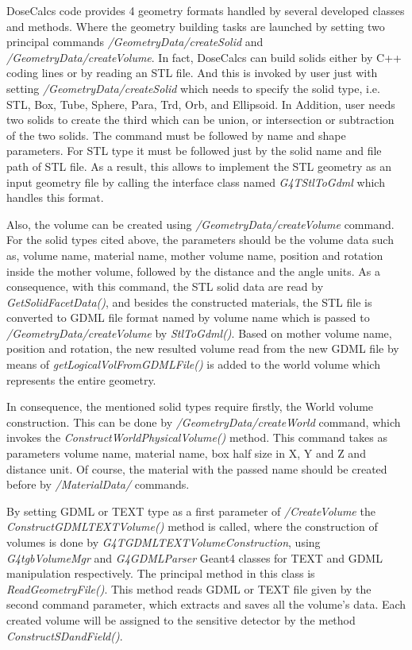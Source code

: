 \documentclass[letterpaper,12pt]{article}
\begin{document}
DoseCalcs code provides 4 geometry formats handled by several developed classes and methods. Where the geometry building tasks are launched by setting two principal commands \textit{/GeometryData/createSolid} and \textit{/GeometryData/createVolume}. In fact, DoseCalcs can build solids either by C++ coding lines or by reading an STL file. And this is invoked by user just with setting \textit{/GeometryData/createSolid} which needs to specify the solid type, i.e. STL, Box, Tube, Sphere, Para, Trd, Orb, and Ellipsoid. In Addition, user needs two solids to create the third which can be union, or intersection or subtraction of the two solids. The command must be followed by name and shape parameters. For STL type it must be followed just by the solid name and file path of STL file. As a result, this allows to implement the STL geometry as an input geometry file by calling the interface class named \textit{G4TStlToGdml} which handles this format.

Also, the volume can be created using \textit{/GeometryData/createVolume} command. For the solid types cited above, the parameters should be the volume data such as, volume name, material name, mother volume name, position and rotation inside the mother volume, followed by the distance and the angle units. As a consequence, with this command, the STL solid data are read by \textit{GetSolidFacetData()}, and besides the constructed materials, the STL file is converted to GDML file format named by volume name which is passed to \textit{/GeometryData/createVolume} by \textit{StlToGdml()}. Based on mother volume name, position and rotation, the new resulted volume read from the new GDML file by means of \textit{getLogicalVolFromGDMLFile()} is added to the world volume which represents the entire geometry. 

In consequence, the mentioned solid types require firstly, the World volume construction. This can be done by \textit{/GeometryData/createWorld} command, which invokes the \textit{ConstructWorldPhysicalVolume()} method. This command takes as parameters volume name, material name, box half size in X, Y and Z and distance unit. Of course, the material with the passed name should be created before by \textit{/MaterialData/} commands.

By setting GDML or TEXT type as a first parameter of \textit{/CreateVolume} the \textit{ConstructGDMLTEXTVolume()} method is called, where the construction of volumes is done by \textit{G4TGDMLTEXTVolumeConstruction}, using \textit{G4tgbVolumeMgr} and \textit{G4GDMLParser} Geant4 classes for TEXT and GDML manipulation respectively. The principal method in this class is \textit{ReadGeometryFile()}. This method reads GDML or TEXT file given by the second command parameter, which extracts and saves all the volume's data. Each created volume will be assigned to the sensitive detector by the method \textit{ConstructSDandField()}.
\end{document}
